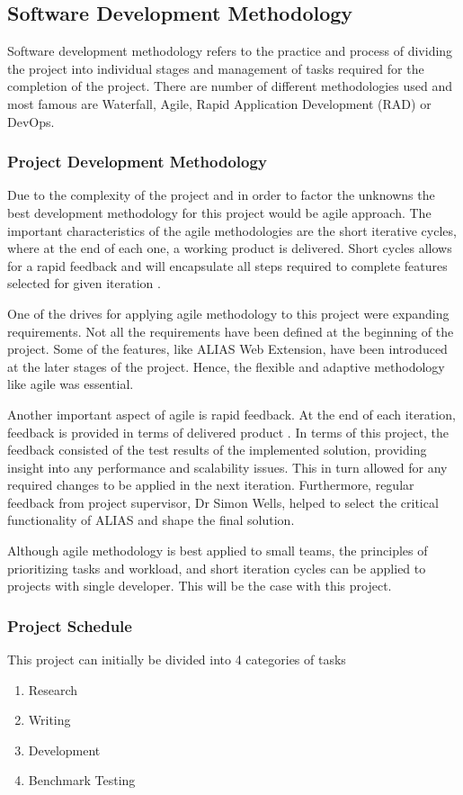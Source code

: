 \subsection{Software Development Methodology}
Software development methodology refers to the practice and process of dividing the project into individual stages and management of tasks required for the completion of the project. There are number of different methodologies used and most famous are Waterfall, Agile, Rapid Application Development (RAD) or DevOps. 

\subsubsection{Project Development Methodology}
Due to the complexity of the project and in order to factor the unknowns the best development methodology for this project would be agile approach. The important characteristics of the agile methodologies are the short iterative cycles, where at the end of each one, a working product is delivered. Short cycles allows for a rapid feedback and will encapsulate all steps required to complete features selected for given iteration \citep{agile1}.

One of the drives for applying agile methodology to this project were expanding requirements. Not all the requirements have been defined at the beginning of the project. Some of the features, like ALIAS Web Extension, have been introduced at the later stages of the project. Hence, the flexible and adaptive methodology like agile was essential. 

Another important aspect of agile is rapid feedback. At the end of each iteration, feedback is provided in terms of delivered product \citep{agilebook}. In terms of this project, the feedback consisted of the test results of the implemented solution, providing insight into any performance and scalability issues. This in turn allowed for any required changes to be applied in the next iteration. Furthermore, regular feedback from project supervisor, Dr Simon Wells, helped to select the critical functionality of ALIAS and shape the final solution.

Although agile methodology is best applied to small teams, the principles of prioritizing tasks and workload, and short iteration cycles can be applied to projects with single developer. This will be the case with this project. 

\subsubsection{Project Schedule}
This project can initially be divided into 4 categories of tasks
\begin{enumerate}
	\item Research
	\item Writing
	\item Development
	\item Benchmark Testing
\end{enumerate}

